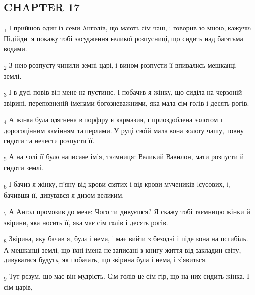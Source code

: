 \subsection{CHAPTER 17}
\begin{tcolorbox}
\textsubscript{1} І прийшов один із семи Анголів, що мають сім чаш, і говорив зо мною, кажучи: Підійди, я покажу тобі засудження великої розпусниці, що сидить над багатьма водами.
\end{tcolorbox}
\begin{tcolorbox}
\textsubscript{2} З нею розпусту чинили земні царі, і вином розпусти її впивались мешканці землі.
\end{tcolorbox}
\begin{tcolorbox}
\textsubscript{3} І в дусі повів він мене на пустиню. І побачив я жінку, що сиділа на червоній звірині, переповненій іменами богозневажними, яка мала сім голів і десять рогів.
\end{tcolorbox}
\begin{tcolorbox}
\textsubscript{4} А жінка була одягнена в порфіру й кармазин, і приоздоблена золотом і дорогоцінним камінням та перлами. У руці своїй мала вона золоту чашу, повну гидоти та нечести розпусти її.
\end{tcolorbox}
\begin{tcolorbox}
\textsubscript{5} А на чолі її було написане ім'я, таємниця: Великий Вавилон, мати розпусти й гидоти землі.
\end{tcolorbox}
\begin{tcolorbox}
\textsubscript{6} І бачив я жінку, п'яну від крови святих і від крови мучеників Ісусових, і, бачивши її, дивувався я дивом великим.
\end{tcolorbox}
\begin{tcolorbox}
\textsubscript{7} А Ангол промовив до мене: Чого ти дивуєшся? Я скажу тобі таємницю жінки й звірини, яка носить її, яка має сім голів і десять рогів.
\end{tcolorbox}
\begin{tcolorbox}
\textsubscript{8} Звірина, яку бачив я, була і нема, і має вийти з безодні і піде вона на погибіль. А мешканці землі, що їхні імена не записані в книгу життя від закладин світу, дивуватися будуть, як побачать, що звірина була і нема, і з'явиться.
\end{tcolorbox}
\begin{tcolorbox}
\textsubscript{9} Тут розум, що має він мудрість. Сім голів це сім гір, що на них сидить жінка. І сім царів,
\end{tcolorbox}
